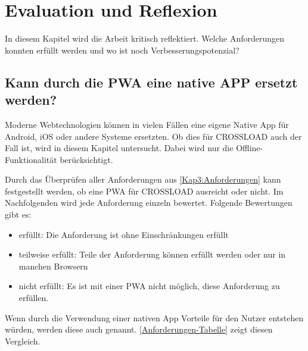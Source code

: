 \chapter{Evaluation und Reflexion}
\label{Kap6}
In diesem Kapitel wird die Arbeit kritisch reflektiert. Welche Anforderungen konnten erfüllt werden und wo ist noch Verbesserungspotenzial?

\section{Kann durch die PWA eine native APP ersetzt werden?}
Moderne Webtechnologien können in vielen Fällen eine eigene Native App für Android, iOS oder andere Systeme ersetzten. Ob dies für CROSSLOAD auch der Fall ist, wird in diesem Kapitel untersucht. Dabei wird nur die Offline-Funktionalität berücksichtigt.

Durch das Überprüfen aller Anforderungen aus \autoref{Kap3:Anforderungen} kann festgestellt werden, ob eine \ac{PWA} für CROSSLOAD ausreicht oder nicht. Im Nachfolgenden wird jede Anforderung einzeln bewertet. Folgende Bewertungen gibt es:
\begin{itemize}
\item erfüllt: Die Anforderung ist ohne Einschränkungen erfüllt
\item teilweise erfüllt: Teile der Anforderung können erfüllt werden oder nur in manchen Browsern
\item nicht erfüllt: Es ist mit einer \ac{PWA} nicht möglich, diese Anforderung zu erfüllen.
\end{itemize}

Wenn durch die Verwendung einer nativen App Vorteile für den Nutzer entstehen würden, werden diese auch genannt. \autoref{Anforderungen-Tabelle} zeigt diesen Vergleich.

